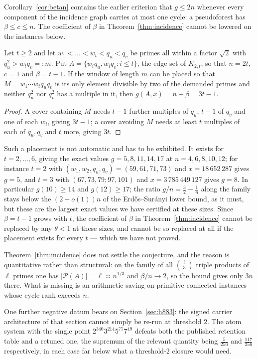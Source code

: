 Corollary~\ref{cor:betan} contains the earlier criterion that $g\le2n$ whenever every component of the
incidence graph carries at most one cycle: a pseudoforest has $\beta\le c\le n$. The coefficient of $\beta$ in
Theorem~\ref{thm:incidence} cannot be lowered on the instances below.

\begin{proposition}[sharpness]\label{prop:incsharp}
Let $t\ge2$ and let $w_1<\dots<w_t<q_u<q_v$ be primes all within a factor $\sqrt2$ with
$q_u^2>w_tq_v=:m$. Put $A=\{w_iq_u,w_iq_v:i\le t\}$, the edge set of $K_{2,t}$, so that $n=2t$,
$c=1$ and $\beta=t-1$. If the window of length $m$ can be placed so that $M=w_1\cdots w_tq_uq_v$ is
its only element divisible by two of the demanded primes and neither $q_u^2$ nor $q_v^2$ has a
multiple in it, then $g(A,x)=n+\beta=3t-1$.
\end{proposition}
\begin{proof}
A cover containing $M$ needs $t-1$ further multiples of $q_u$, $t-1$ of $q_v$ and one of each $w_i$,
giving $3t-1$; a cover avoiding $M$ needs at least $t$ multiples of each of $q_u,q_v$ and $t$ more,
giving $3t$.
\end{proof}

Such a placement is not automatic and has to be exhibited. It exists for $t=2,\dots,6$, giving the
exact values $g=5,8,11,14,17$ at $n=4,6,8,10,12$; for instance $t=2$ with
$(w_1,w_2,q_u,q_v)=(59,61,71,73)$ and $x=18\,652\,287$ gives $g=5$, and $t=3$ with
$(67,73,79;97,101)$ and $x=3\,785\,449\,127$ gives $g=8$. In particular $g(10)\ge14$ and
$g(12)\ge17$; the ratio $g/n=\tfrac32-\tfrac1n$ along the family stays below the $(2-o(1))n$ of the
Erd\H{o}s--Sur\'anyi lower bound, as it must, but these are the largest exact values we have
certified at these sizes. Since $\beta=t-1$ grows with $t$, the coefficient of $\beta$ in
Theorem~\ref{thm:incidence} cannot be replaced by any $\theta<1$ at these sizes, and cannot be so
replaced at all if the placement exists for every $t$ --- which we have not proved.

Theorem~\ref{thm:incidence} does not settle the conjecture, and the reason is quantitative rather than
structural: on the family of all $\binom\ell3$ triple products of $\ell$ primes one has
$|\mathcal P(A)|=\ell\asymp n^{1/3}$ and $\beta/n\to2$, so the bound gives only $3n$ there. What is
missing is an arithmetic saving on primitive connected instances whose cycle rank exceeds $n$.

One further negative datum bears on Section~\ref{sec:h883}: the signed carrier architecture of that
section cannot simply be re-run at threshold $2$. The atom system with the single point
$2^{340}3^{214}5^{77}7^{49}$ defeats both the published retention table and a retuned one, the
supremum of the relevant quantity being $\tfrac5{256}$ and $\tfrac{117}{256}$ respectively, in each
case far below what a threshold-$2$ closure would need.

